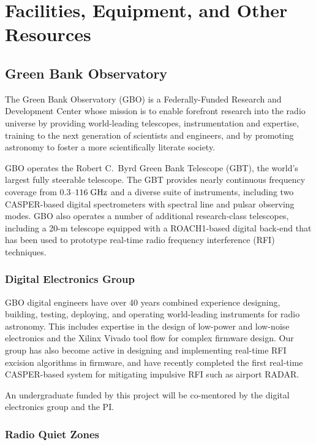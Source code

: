 \documentclass[10pt]{NSF}
\begin{document}
\section{Facilities, Equipment, and Other Resources}

\subsection{Green Bank Observatory}
\label{sec:gbo}

The Green Bank Observatory (GBO) is a Federally-Funded Research and
Development Center whose mission is to enable forefront research into
the radio universe by providing world-leading telescopes,
instrumentation and expertise, training to the next generation of
scientists and engineers, and by promoting astronomy to foster a more
scientifically literate society.

GBO operates the Robert C.\ Byrd Green Bank Telescope (GBT), the
world's largest fully steerable telescope.  The GBT provides nearly
continuous frequency coverage from $0.3$--$116\; \textrm{GHz}$ and a diverse
suite of instruments, including two CASPER-based digital spectrometers
with spectral line and pulsar observing modes.  GBO also operates a
number of additional research-class telescopes, including a 20-m
telescope equipped with a ROACH1-based digital back-end that has been
used to prototype real-time radio frequency interference (RFI)
techniques.

\subsubsection{Digital Electronics Group}
\label{sec:digital_group}

GBO digital engineers have over 40 years combined experience
designing, building, testing, deploying, and operating world-leading
instruments for radio astronomy.  This includes expertise in the
design of low-power and low-noise electronics and the Xilinx Vivado
tool flow for complex firmware design.  Our group has also become
active in designing and implementing real-time RFI excision algorithms
in firmware, and have recently completed the first real-time
CASPER-based system for mitigating impulsive RFI such as airport
RADAR.

An undergraduate funded by this project will be co-mentored by the
digital electronics group and the PI.

\subsubsection{Radio Quiet Zones}
\label{sec:quiet_zone}
\end{document}

